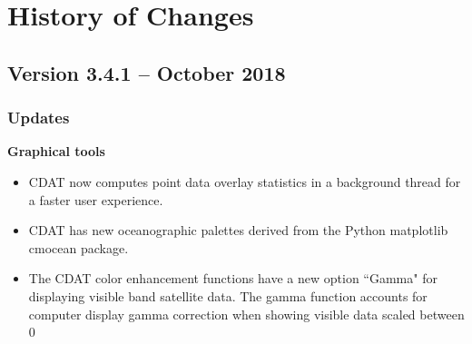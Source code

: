 \chapter{History of Changes}
\label{history}

\renewcommand{\thesection}{}
\renewcommand{\thesubsection}{\arabic{section}.\arabic{subsection}}
\makeatletter
\def\@seccntformat#1{\csname #1ignore\expandafter\endcsname\csname the#1\endcsname\quad}
\let\sectionignore\@gobbletwo
\let\latex@numberline\numberline
\def\numberline#1{\if\relax#1\relax\else\latex@numberline{#1}\fi}
\makeatother


\section{Version 3.4.1 -- October 2018}

\subsection*{ Updates}

\hspace{0.4cm} {\bf Graphical tools}
\begin{itemize}

  \item CDAT now computes point data overlay statistics in a background thread
  for a faster user experience.

  \item CDAT has new oceanographic palettes derived from the Python matplotlib
  cmocean package.

  \item The CDAT color enhancement functions have a new option ``Gamma" for
  displaying visible band satellite data.  The gamma function accounts for
  computer display gamma correction when showing visible data scaled between
  0%

\end{itemize}

